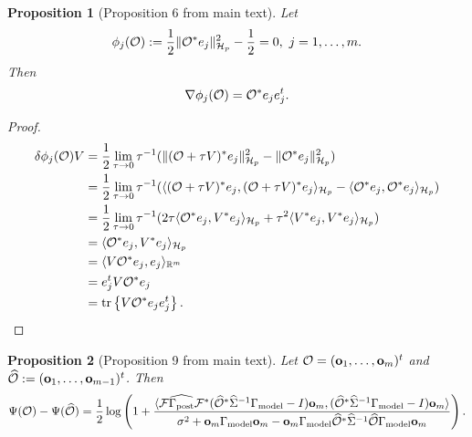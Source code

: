 \documentclass{article}
\newtheorem{proposition}{Proposition}
\begin{document}
\begin{proposition}[Proposition 6 from main text]%
  Let
  \begin{align*}
    \phi_j(\mathcal{O}) :=\frac12 \| \mathcal{O}^* e_j\|_{\mathcal{H}_p}^2 - \frac12 = 0,\ j=1,\dots,m.
  \end{align*}
  Then
  \begin{equation*}
    \nabla \phi_j(\mathcal{O}) = \mathcal{O}^* e_je_j^t.
  \end{equation*}
\end{proposition}

\begin{proof}
  \begin{align*}
    \delta \phi_j(\mathcal{O})V  
    &= \frac12\lim_{\tau \to 0}\tau^{-1}
    ( \|(\mathcal{O} + \tau V)^*e_j \|_{\mathcal{H}_p}^2 - \|\mathcal{O} ^*e_j \|_{\mathcal{H}_p}^2  ) \\
    &= \frac12\lim_{\tau \to 0}\tau^{-1}
    ( \langle (\mathcal{O} + \tau V)^*e_j, (\mathcal{O} + \tau V)^*e_j \rangle_{\mathcal{H}_p} - 
    \langle \mathcal{O}^*e_j, \mathcal{O}^*e_j \rangle_{\mathcal{H}_p} ) \\
    &= \frac12\lim_{\tau \to 0}\tau^{-1}
    (2\tau \langle \mathcal{O}^*e_j,V^*e_j \rangle_{\mathcal{H}_p} 
    +\tau^2 \langle V^*e_j, V^*e_j \rangle_{\mathcal{H}_p} ) \\
    &= \langle \mathcal{O}^*e_j,V^*e_j \rangle_{\mathcal{H}_p} \\
    &= \langle V \mathcal{O}^*e_j,e_j \rangle_{\mathbb{R}^m} \\
    &= e_j^t V \mathcal{O}^* e_j \\
    &= \textup{tr}\left \{V \mathcal{O}^* e_je_j^t \right \}.
  \end{align*}
\end{proof}
















\begin{proposition}[Proposition 9 from main text]
  Let $\mathcal{O} = (\mathbf{o}_1,\dots,\mathbf{o}_m)^t$ and $\widehat{\mathcal{O}} :=
  (\mathbf{o}_1,\dots,\mathbf{o}_{m-1})^t$. Then
  \begin{equation}\label{eq:conclusion}
    \Psi( \mathcal{O} ) - \Psi (\widehat{\mathcal{O}} ) =
    \frac12 \log \left ( 1 + \frac{
      \langle \mathcal{F} \widehat{\Gamma_{\textup{post}}} \mathcal{F}^* (\widehat{\mathcal{O}}^* \widehat{\Sigma}^{-1} \Gamma_{\textup{model}} - I ) \mathbf{o}_m,
      (\widehat{\mathcal{O}}^* \widehat{\Sigma}^{-1} \Gamma_{\textup{model}} - I ) \mathbf{o}_m \rangle
    }{
      \sigma^2 + \mathbf{o}_m \Gamma_{\textup{model}} \mathbf{o}_m - \mathbf{o}_m \Gamma_{\textup{model}} \widehat{\mathcal{O}}^* \widehat{\Sigma}^{-1} \widehat{\mathcal{O}} \Gamma_{\textup{model}} \mathbf{o}_m 
    }       
    \right ).
  \end{equation}
\end{proposition}
\end{document}
